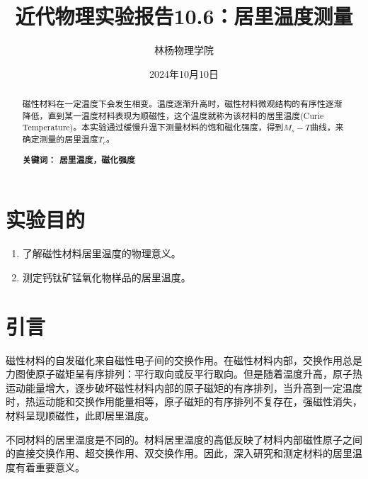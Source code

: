\documentclass[a4paper]{article}
\title{近代物理实验报告10.6：居里温度测量}
\author{林杨\quad 211840092\quad 物理学院}
\date{2024年10月10日}
\providecommand{\keywords}[1]{\textbf{关键词： #1}}
\begin{document}
\maketitle


\begin{abstract}
    磁性材料在一定温度下会发生相变。温度逐渐升高时，磁性材料微观结构的有序性逐渐降低，直到某一温度材料表现为顺磁性，这个温度就称为该材料的居里温度(Curie Temperature)。本实验通过缓慢升温下测量材料的饱和磁化强度，得到$M_s - T$曲线，来确定测量的居里温度$T_c$。

    \keywords{居里温度，磁化强度}
\end{abstract}

\section{实验目的}
\begin{enumerate}
    \item 了解磁性材料居里温度的物理意义。
    \item 测定钙钛矿锰氧化物样品的居里温度。
\end{enumerate}

\section{引言}
磁性材料的自发磁化来自磁性电子间的交换作用。在磁性材料内部，交换作用总是力图使原子磁矩呈有序排列：平行取向或反平行取向。但是随着温度升高，原子热运动能量增大，逐步破坏磁性材料内部的原子磁矩的有序排列，当升高到一定温度时，热运动能和交换作用能量相等，原子磁矩的有序排列不复存在，强磁性消失，材料呈现顺磁性，此即居里温度。

不同材料的居里温度是不同的。材料居里温度的高低反映了材料内部磁性原子之间的直接交换作用、超交换作用、双交换作用。因此，深入研究和测定材料的居里温度有着重要意义。
\end{document}

